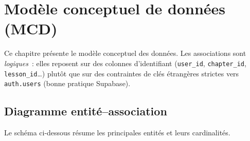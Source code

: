 \chapter{Modèle conceptuel de données (MCD)}
\label{chap:mcd}

Ce chapitre présente le modèle conceptuel des données. Les associations sont
\emph{logiques}~: elles reposent sur des colonnes d'identifiant (\texttt{user\_id},
\texttt{chapter\_id}, \texttt{lesson\_id}\dots) plutôt que sur des contraintes de
clés étrangères strictes vers \texttt{auth.users} (bonne pratique Supabase).

\section{Diagramme entité--association}
Le schéma ci-dessous résume les principales entités et leurs cardinalités.

